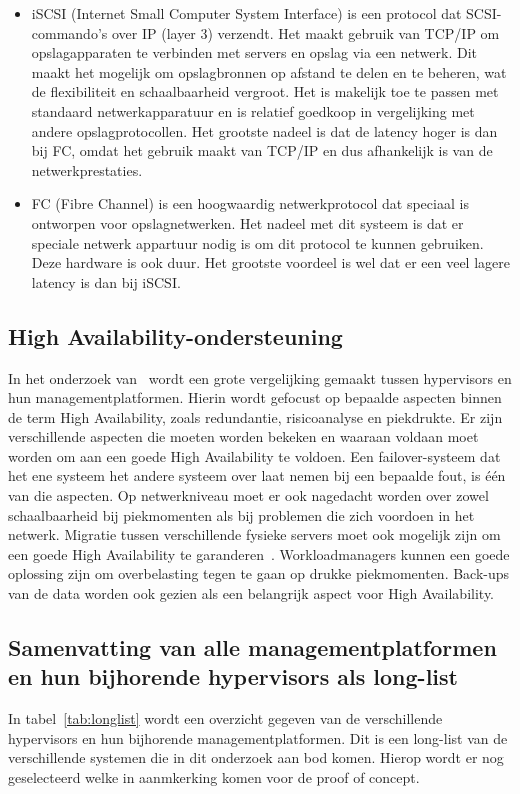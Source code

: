 \begin{itemize}
    \item iSCSI (Internet Small Computer System Interface) is een protocol dat SCSI-commando's over IP (layer 3) verzendt. Het maakt gebruik van TCP/IP om opslagapparaten te verbinden met servers en opslag via een netwerk. Dit maakt het mogelijk om opslagbronnen op afstand te delen en te beheren, wat de flexibiliteit en schaalbaarheid vergroot. Het is makelijk toe te passen met standaard netwerkapparatuur en is relatief goedkoop in vergelijking met andere opslagprotocollen. Het grootste nadeel is dat de latency hoger is dan bij FC, omdat het gebruik maakt van TCP/IP en dus afhankelijk is van de netwerkprestaties.
    \item FC (Fibre Channel) is een hoogwaardig netwerkprotocol dat speciaal is ontworpen voor opslagnetwerken. Het nadeel met dit systeem is dat er speciale netwerk appartuur nodig is om dit protocol te kunnen gebruiken. Deze hardware is ook duur. Het grootste voordeel is wel dat er een veel lagere latency is dan bij iSCSI. 
\end{itemize}


\subsection{High Availability-ondersteuning}\label{subsec:ha}
In het onderzoek van~\textcite{dudnik2017creating} wordt een grote vergelijking gemaakt tussen hypervisors en hun managementplatformen. Hierin wordt gefocust op bepaalde aspecten binnen de term High Availability, zoals redundantie, risicoanalyse en piekdrukte.
Er zijn verschillende aspecten die moeten worden bekeken en waaraan voldaan moet worden om aan een goede High Availability te voldoen. Een failover-systeem dat het ene systeem het andere systeem over laat nemen bij een bepaalde fout, is één van die aspecten.
Op netwerkniveau moet er ook nagedacht worden over zowel schaalbaarheid bij piekmomenten als bij problemen die zich voordoen in het netwerk. Migratie tussen verschillende fysieke servers moet ook mogelijk zijn om een goede High Availability te garanderen~\autocite{dudnik2017creating}.
Workloadmanagers kunnen een goede oplossing zijn om overbelasting tegen te gaan op drukke piekmomenten. Back-ups van de data worden ook gezien als een belangrijk aspect voor High Availability.


\subsection{Samenvatting van alle managementplatformen en hun bijhorende hypervisors als long-list}\label{subsec:samenvatting}
In tabel~\ref{tab:longlist} wordt een overzicht gegeven van de verschillende hypervisors en hun bijhorende managementplatformen. Dit is een long-list van de verschillende systemen die in dit onderzoek aan bod komen. Hierop wordt er nog geselecteerd welke in aanmkerking komen voor de proof of concept.

